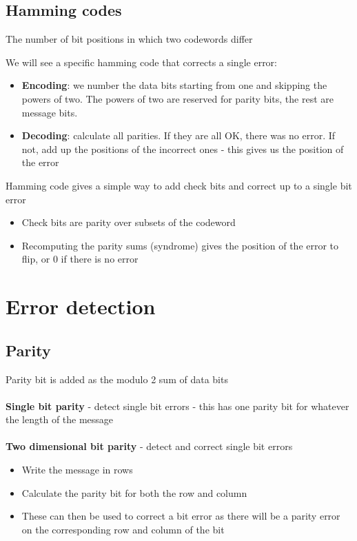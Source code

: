 \documentclass{article}[18pt]
\begin{document}
\subsection{Hamming codes}
\begin{defin}
The number of bit positions in which two codewords differ
\end{defin}
We will see a specific hamming code that corrects a single error:
\begin{itemize}
	\item \textbf{Encoding}: we number the data bits starting from one and skipping the powers of two. The powers of two are reserved for parity bits, the rest are message bits.
	\item \textbf{Decoding}: calculate all parities. If they are all OK, there was no error. If not, add up the positions of the incorrect ones - this gives us the position of the error
\end{itemize}
Hamming code gives a simple way to add check bits and correct up to a single bit error
\begin{itemize}
	\item Check bits are parity over subsets of the codeword
	\item Recomputing the parity sums (syndrome) gives the position of the error to flip, or 0 if there is no error
\end{itemize}
\section{Error detection}
\subsection{Parity}
Parity bit is added as the modulo 2 sum of data bits\\
\\
\textbf{Single bit parity} - detect single bit errors - this has one parity bit for whatever the length of the message\\
\\
\textbf{Two dimensional bit parity} - detect and correct single bit errors
\begin{itemize}
	\item Write the message in rows
	\item Calculate the parity bit for both the row and column
	\item These can then be used to correct a bit error as there will be a parity error on the corresponding row and column of the bit
\end{itemize}
\end{document}
